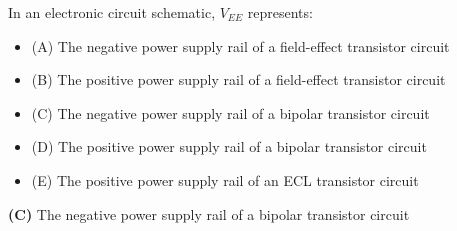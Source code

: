 

In an electronic circuit schematic, $V_{EE}$ represents:

\begin{itemize}
\item{(A)} The negative power supply rail of a field-effect transistor circuit
\vskip 5pt 
\item{(B)} The positive power supply rail of a field-effect transistor circuit
\vskip 5pt 
\item{(C)} The negative power supply rail of a bipolar transistor circuit
\vskip 5pt 
\item{(D)} The positive power supply rail of a bipolar transistor circuit
\vskip 5pt 
\item{(E)} The positive power supply rail of an ECL transistor circuit
\end{itemize}







{\bf (C)} The negative power supply rail of a bipolar transistor circuit
 










